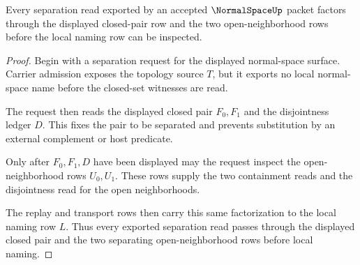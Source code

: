 \begin{theorem}
\label{thm:normal-space-open-separation-route}
Every separation read exported by an accepted $\NormalSpaceUp$ packet factors through the displayed closed-pair row and the two open-neighborhood rows before the local naming row can be inspected.
\end{theorem}
\begin{proof}
Begin with a separation request for the displayed normal-space surface. Carrier admission exposes the topology source $T$, but it exports no local normal-space name before the closed-set witnesses are read.

The request then reads the displayed closed pair $F_0,F_1$ and the disjointness ledger $D$. This fixes the pair to be separated and prevents substitution by an external complement or host predicate.

Only after $F_0,F_1,D$ have been displayed may the request inspect the open-neighborhood rows $U_0,U_1$. These rows supply the two containment reads and the disjointness read for the open neighborhoods.

The replay and transport rows then carry this same factorization to the local naming row $L$. Thus every exported separation read passes through the displayed closed pair and the two separating open-neighborhood rows before local naming.
\end{proof}

